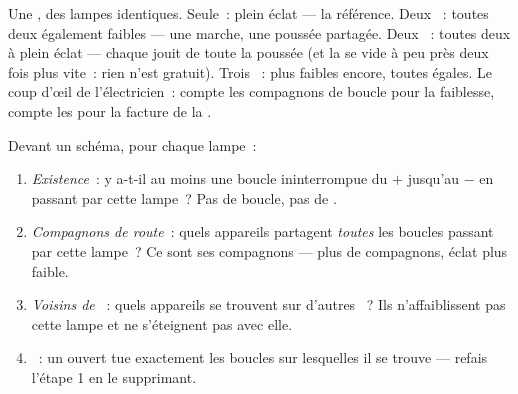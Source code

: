 \begin{example}\label{ex:g7:circuits-series-parallel:brightness}
Une , des lampes identiques. Seule~: plein éclat --- la
référence. Deux ~: toutes deux également faibles --- une
marche, une poussée partagée. Deux ~: toutes deux à
plein éclat --- chaque  jouit de toute la poussée (et la 
se vide à peu près deux fois plus vite~: rien n'est gratuit). Trois
~: plus faibles encore, toutes égales. Le coup d'œil de
l'électricien~: compte les compagnons de boucle pour la faiblesse,
compte les  pour la facture de la .
\end{example}

\begin{method}\label{met:g7:circuits-series-parallel:predict}
Devant un schéma, pour chaque lampe~:
\begin{enumerate}
  \item \emph{Existence}~: y a-t-il au moins une boucle
        ininterrompue du $+$ jusqu'au $-$ en passant par cette
        lampe~? Pas de boucle, pas de .
  \item \emph{Compagnons de route}~: quels appareils partagent
        \emph{toutes} les boucles passant par cette lampe~? Ce sont
        ses compagnons  --- plus de compagnons, éclat plus
        faible.
  \item \emph{Voisins de }~: quels appareils se trouvent sur
        d'autres ~? Ils n'affaiblissent pas cette lampe et
        ne s'éteignent pas avec elle.
  \item \emph{}~: un  ouvert tue exactement
        les boucles sur lesquelles il se trouve --- refais l'étape 1
        en le supprimant.
\end{enumerate}
\end{method}

